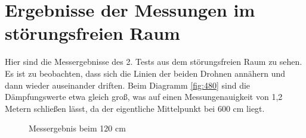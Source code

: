 \documentclass[a4paper]{spie}  %
\begin{document}
\section{Ergebnisse der Messungen im störungsfreien Raum}\label{testAnhang}
Hier sind die Messergebnisse des 2. Tests aus dem störungsfreien Raum zu sehen. Es ist zu beobachten, dass sich die Linien der beiden Drohnen annähern und dann wieder auseinander driften. Beim Diagramm \ref{fig:480} sind die Dämpfungswerte etwa gleich groß, was auf einen Messungenauigkeit von 1,2 Metern schließen lässt, da der eigentliche Mittelpunkt bei 600 cm liegt.

\begin{figure}[H]
	\centering
		\caption{Messergebnis beim 120 cm}
		\label{fig:120}
\end{figure}
\end{document}
